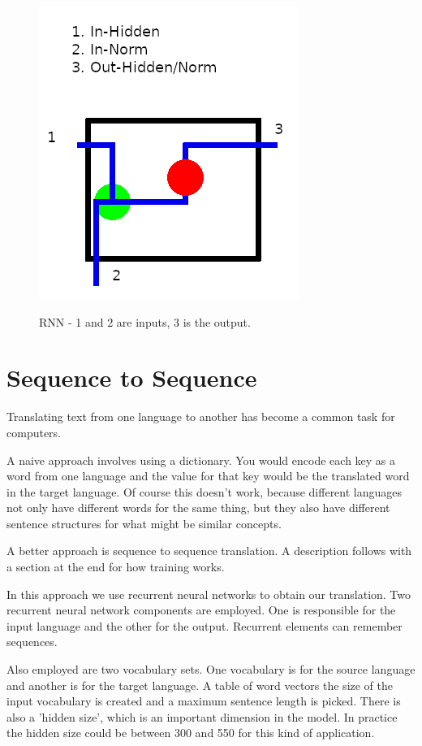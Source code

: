 \begin{figure}[H]
	
	\includegraphics[scale=0.5]{diagram-rnn}
	
	RNN - 1 and 2 are inputs, 3 is the output.
	
\end{figure}

\section{Sequence to Sequence}

Translating text from one language to another has become a common task for computers. 

A naive approach involves using a dictionary. You would encode each key as a word from one language and the value for that key would be the translated word in the target language. Of course this doesn't work, because different languages not only have different words for the same thing, but they also have different sentence structures for what might be similar concepts.

A better approach is sequence to sequence translation. A description follows with a section at the end for how training works.

In this approach we use recurrent neural networks to obtain our translation. Two recurrent neural network components are employed. One is responsible for the input language and the other for the output. Recurrent elements can remember sequences. 

Also employed are two vocabulary sets. One vocabulary is for the source language and another is for the target language. A table of word vectors the size of the input vocabulary is created and a maximum sentence length is picked. There is also a 'hidden size', which is an important dimension in the model. In practice the hidden size could be between 300 and 550 for this kind of application.

